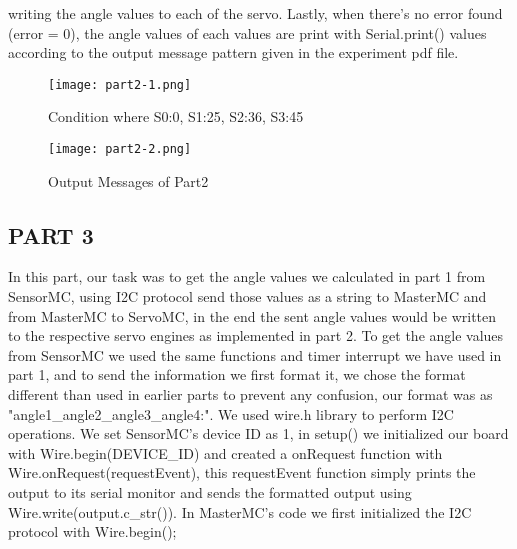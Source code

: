 \documentclass[pdftex,12pt,a4paper]{article}
\begin{document}
writing the angle values to each of the servo. Lastly, when there's no error found (error = 0), the angle values of each values are print with Serial.print() values according to the output message pattern given in the experiment pdf file.

\begin{figure}[H]
	\centering
	\texttt{[image: part2-1.png]}	
	\caption{Condition where S0:0, S1:25, S2:36, S3:45}
	\label{fig5}
\end{figure}
\begin{figure}[H]
	\centering
	\texttt{[image: part2-2.png]}	
	\caption{Output Messages of Part2}
	\label{fig5}
\end{figure}


\subsection{PART 3}
In this part, our task was to get the angle values we calculated in part 1 from SensorMC, using I2C protocol send those values as a string to MasterMC and from MasterMC to ServoMC, in the end the sent angle values would be written to the respective servo engines as implemented in part 2. To get the angle values from SensorMC we used the same functions and timer interrupt we have used in part 1, and to send the information we first format it, we chose the format different than used in earlier parts to prevent any confusion, our format was as "angle1\_angle2\_angle3\_angle4:". We used wire.h library to perform I2C operations. We set SensorMC's device ID as 1, in setup() we initialized our board with Wire.begin(DEVICE\_ID) and created a onRequest function with Wire.onRequest(requestEvent), this requestEvent function simply prints the output to its serial monitor and sends the formatted output using Wire.write(output.c\_str()).
In MasterMC's code we first initialized the I2C protocol with Wire.begin();
\end{document}
